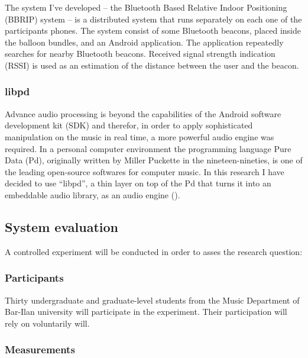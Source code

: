 The system I've developed -- the Bluetooth Based Relative Indoor Positioning (BBRIP) system -- is a distributed system that runs separately on each one of the participants phones. The system consist of some Bluetooth beacons, placed inside the balloon bundles, and an Android application. The application repeatedly searches for nearby Bluetooth beacons. Received signal strength indication (RSSI) is used as an estimation of the distance between the user and the beacon.

\subsubsection{libpd}\label{methods:libpd}

Advance audio processing is beyond the capabilities of the Android software development kit (SDK) and therefor, in order to apply sophisticated manipulation on the music in real time, a more powerful audio engine was required. In a personal computer environment the programming language Pure Data (Pd), originally written by Miller Puckette in the nineteen-nineties, is one of the leading open-source softwares for computer music. In this research I have decided to use ``libpd'', a thin layer on top of the Pd that turns it into an embeddable audio library, as an audio engine ().

\subsection{System evaluation}

A controlled experiment will be conducted in order to asses the research question: \emph{\reserchquestion}

\subsubsection{Participants}

Thirty undergraduate and graduate-level students from the Music Department of Bar-Ilan university will participate in the experiment. Their participation will rely on voluntarily will.

\subsubsection{Measurements}

